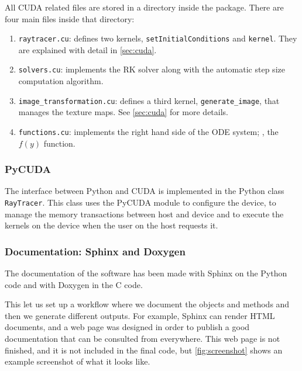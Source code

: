All \ac{CUDA} related files are stored in a directory inside the package. There are four main files inside that directory:
\begin{enumerate}
	\item \lstinline{raytracer.cu}: defines two kernels, \lstinline{setInitialConditions} and \lstinline{kernel}. They are explained with detail in \autoref{sec:cuda}.
	\item \lstinline{solvers.cu}: implements the \ac{RK} solver along with the automatic step size computation algorithm.
	\item \lstinline{image_transformation.cu}: defines a third kernel, \lstinline{generate_image}, that manages the texture maps. See \autoref{sec:cuda} for more details.
	\item \lstinline{functions.cu}: implements the right hand side of the \ac{ODE} system; \ie, the $f(y)$ function.
\end{enumerate}

\subsubsection*{PyCUDA}

The interface between Python and \ac{CUDA} is implemented in the Python class \lstinline{RayTracer}. This class uses the PyCUDA module to configure the device, to manage the memory transactions between host and device and to execute the kernels on the device when the user on the host requests it.

\subsubsection*{Documentation: Sphinx and Doxygen}

The documentation of the software has been made with Sphinx on the Python code and with Doxygen in the C code.

This let us set up a workflow where we document the objects and methods and then we generate different outputs. For example, Sphinx can render HTML documents, and a web page was designed in order to publish a good documentation that can be consulted from everywhere. This web page is not finished, and it is not included in the final code, but \autoref{fig:screenshot} shows an example screenshot of what it looks like.


